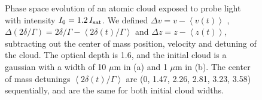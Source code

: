 \documentclass[12pt]{iopart}
\begin{document}
\begin{figure}
\caption{Phase space evolution of an atomic cloud exposed to probe light with intensity $I_0=1.2\, I_{\rm{sat}}$. We defined $\Delta v=v -\left< v(t) \right>$ ,  $\Delta (2\delta/\Gamma)=2\delta/\Gamma -\left< 2\delta(t)/\Gamma \right>$ and $\Delta z=z-\left< z(t) \right>$, subtracting out the center of mass position, velocity and detuning of the cloud. The optical depth is 1.6, and the initial cloud is a gaussian with a width of 10 $\mu$m in (a) and 1 $\mu$m in (b). The center of mass detunings $\left< 2\delta(t)/\Gamma \right>$ are (0,  1.47,  2.26,  2.81,  3.23, 3.58) sequentially, and are the same for both initial cloud widths. }  
\label{fig:phaseSpace}
\end{figure}
\end{document}

